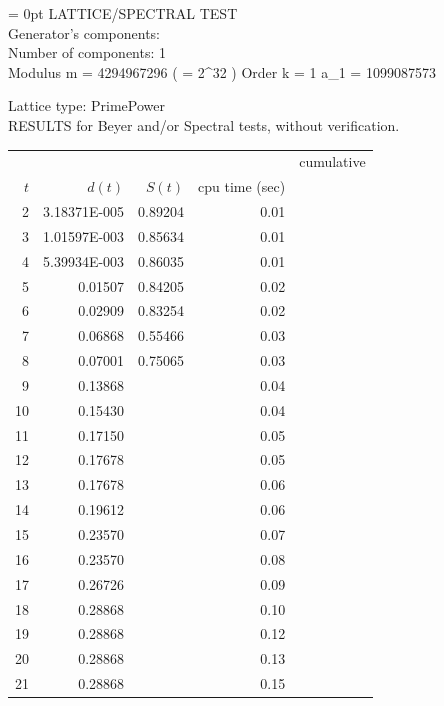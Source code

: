 \parindent = 0pt 
 LATTICE/SPECTRAL TEST \\
 Generator's components:\\
 Number of components:  1\\
   Modulus  m = 4294967296 ( = 2^32 )
   Order    k = 1
   a_1 = 1099087573

 Lattice type: PrimePower \\


RESULTS for Beyer and/or Spectral tests, without verification.\\

\begin {tabular}{|rrrrr|}
\hline
 &&&&  cumulative \\
   $t$ &      $d(t)$ &      $S(t)$ &  cpu time (sec)\\
\hline
    2  & 3.18371E-005 &     0.89204 &      0.01 \\
    3  & 1.01597E-003 &     0.85634 &      0.01 \\
    4  & 5.39934E-003 &     0.86035 &      0.01 \\
    5  &      0.01507 &     0.84205 &      0.02 \\
    6  &      0.02909 &     0.83254 &      0.02 \\
    7  &      0.06868 &     0.55466 &      0.03 \\
    8  &      0.07001 &     0.75065 &      0.03 \\
    9  &      0.13868 &             &      0.04 \\
   10  &      0.15430 &             &      0.04 \\
   11  &      0.17150 &             &      0.05 \\
   12  &      0.17678 &             &      0.05 \\
   13  &      0.17678 &             &      0.06 \\
   14  &      0.19612 &             &      0.06 \\
   15  &      0.23570 &             &      0.07 \\
   16  &      0.23570 &             &      0.08 \\
   17  &      0.26726 &             &      0.09 \\
   18  &      0.28868 &             &      0.10 \\
   19  &      0.28868 &             &      0.12 \\
   20  &      0.28868 &             &      0.13 \\
   21  &      0.28868 &             &      0.15 \\

\end{tabular}
